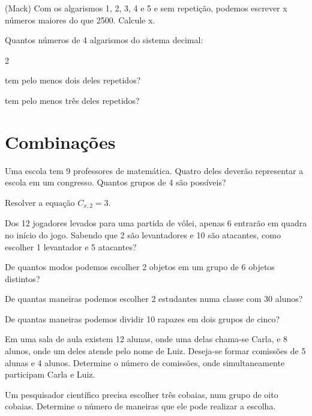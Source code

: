 	\item (Mack) Com os algarismos 1, 2, 3, 4 e 5 e sem repetição, podemos escrever x números maiores do que 2500. Calcule x.

	\item Quantos números de 4 algarismos do sistema decimal:
	\begin{enumerate}
	\end{enumerate}
	
		
\section{Combinações}

\item Uma escola tem 9 professores de matemática. Quatro deles deverão representar a escola em um congresso. Quantos grupos de 4 são possíveis? 

\item Resolver a equação $C_{x, 2} = 3$.

\item Dos 12 jogadores levados para uma partida de vôlei, apenas 6 entrarão em quadra no início do jogo. Sabendo que 2 são levantadores e 10 são atacantes, como escolher 1 levantador e 5 atacantes?

\item De quantos modos podemos escolher 2 objetos em um grupo de 6 objetos distintos?

\item De quantas maneiras podemos escolher 2 estudantes numa classe com 30 alunos?

\item De quantas maneiras podemos dividir 10 rapazes em dois grupos de cinco?

\item Em uma sala de aula existem 12 alunas, onde uma delas chama-se Carla, e 8 alunos, onde um deles atende pelo nome de Luiz. Deseja-se formar comissões de 5 alunas e 4 alunos. Determine o número de comissões, onde simultaneamente participam Carla e Luiz.

\item Um pesquisador científico precisa escolher três cobaias, num grupo de oito cobaias. Determine o número de maneiras que ele pode realizar a escolha.

